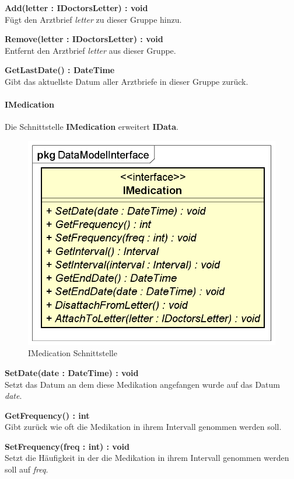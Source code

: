 \documentclass[a4paper]{scrreprt}
\begin{document}
\textbf{Add(letter : IDoctorsLetter) : void}\\
Fügt den Arztbrief \textit{letter} zu dieser Gruppe hinzu.

\textbf{Remove(letter : IDoctorsLetter) : void}\\
Entfernt den Arztbrief \textit{letter} aus dieser Gruppe.

\textbf{GetLastDate() : DateTime}\\
Gibt das aktuellste Datum aller Arztbriefe in dieser Gruppe zurück.

\paragraph{IMedication}
Die Schnittstelle \textbf{IMedication} erweitert \textbf{IData}.

\begin{figure}[H]
\centering
\includegraphics[width=0.55\textheight]{graphics/Klassendiagramme/Model/IMedication.png}
\caption{IMedication Schnittstelle}
\end{figure}
\textbf{SetDate(date : DateTime) : void}\\
Setzt das Datum an dem diese Medikation angefangen wurde auf das Datum \textit{date}.

\textbf{GetFrequency() : int}\\
Gibt zurück wie oft die Medikation in ihrem Intervall genommen werden soll.

\textbf{SetFrequency(freq : int) : void}\\
Setzt die Häufigkeit in der die Medikation in ihrem Intervall genommen werden soll auf \textit{freq}.
\end{document}
